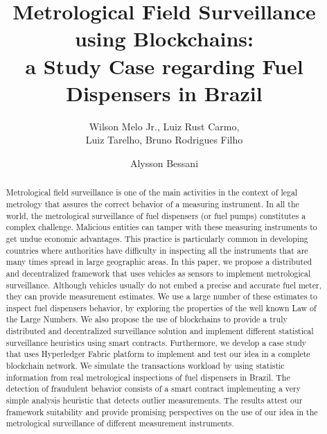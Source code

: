 \documentclass[sigplan]{acmart}
\begin{document}
\title{Metrological Field Surveillance using Blockchains: \\a Study Case regarding Fuel Dispensers in Brazil}

\author{Wilson Melo Jr., Luiz Rust Carmo, \\Luiz Tarelho, Bruno Rodrigues Filho}

\author{Alysson Bessani}



\renewcommand{\shortauthors}{W. Melo Jr et al.}

\begin{abstract}
Metrological field surveillance is one of the main activities in the context of legal metrology that assures the correct behavior of a measuring instrument.
In all the world, the metrological surveillance of fuel dispensers (or fuel pumps) constitutes a complex challenge.
Malicious entities can tamper with these measuring instruments to get undue economic advantages.
This practice is particularly common in developing countries where authorities have difficulty in inspecting all the instruments that are many times spread in large geographic areas.
In this paper, we propose a distributed and decentralized framework that uses vehicles as sensors to implement metrological surveillance.
Although vehicles usually do not embed a precise and accurate fuel meter, they can provide measurement estimates.
We use a large number of these estimates to inspect fuel dispensers behavior, by exploring the properties of the well known Law of the Large Numbers.
We also propose the use of blockchains to provide a truly distributed and decentralized surveillance solution and implement different statistical surveillance heuristics using smart contracts.
Furthermore, we develop a case study that uses Hyperledger Fabric platform to implement and test our idea in a complete blockchain network.
We simulate the transactions workload by using statistic information from real metrological inspections of fuel dispensers in Brazil.
The detection of fraudulent behavior consists of a smart contract implementing a very simple analysis heuristic that detects outlier measurements.
The results attest our framework suitability and provide promising perspectives on the use of our idea in the metrological surveillance of different measurement instruments.
\end{abstract}
\end{document}
